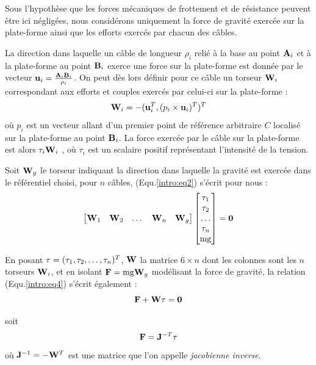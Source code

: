Sous l'hypothèse que les forces mécaniques de frottement et de résistance 
peuvent être ici négligées, nous considérons uniquement la force de gravité 
exercée sur la plate-forme ainsi que les efforts exercés par chacun des câbles.

La direction dans laquelle un câble de longueur $\rho_i$ relié à la base au 
point ${\bf A}_i$ et à la plate-forme au point ${\bf B}_i$ exerce une force sur 
la plate-forme est donnée par le vecteur ${\bf u}_i = \frac{{\bf A}_i{\bf 
B}_i}{\rho_i}$. On peut dès lors définir pour ce câble un torseur ${\bf W}_i$ 
correspondant aux efforts et couples exercés par celui-ci sur la plate-forme :
\begin{equation}
{\bf W}_i = -({\bf u}_i^T, (p_i \times {\bf u}_i)^T)^T
\label{intro:eq3}
\end{equation}
où $p_i$ est un vecteur allant d'un premier point de référence arbitraire 
$C$ localisé sur la plate-forme au point ${\bf B}_i$. La force exercée par le 
câble sur la plate-forme est alors $ \tau_i {\bf W}_i$ , où $\tau_i$ est un 
scalaire positif représentant l'intensité de la tension.

Soit ${\bf W}_g$ le torseur indiquant la direction dans laquelle la gravité est 
exercée dans le référentiel choisi, pour $n$ câbles, (Equ.\ref{intro:eq2}) 
s'écrit pour nous :
\begin{equation}
\begin{bmatrix}
 {\bf W}_1 & {\bf W}_2 & \dots & {\bf W}_n & {\bf W}_g
\end{bmatrix}
\begin{bmatrix}
 \tau_1 \\ \tau_2 \\ \dots \\ \tau_n \\ \hbox{mg}
\end{bmatrix}
= {\bf 0}
\label{intro:eq4}
\end{equation}

En posant ${\bf \tau} = (\tau_1, \tau_2, \dots, \tau_n)^T$, ${\bf W}$ la 
matrice 
$6 \times n$ dont les colonnes sont les $n$ torseurs ${\bf W}_i$, et en isolant 
$\mathcal {\bf F} =  \hbox{mg} {\bf W}_g$ modélisant la force de gravité, la 
relation (Equ.\ref{intro:eq4}) s'écrit également :
\begin{equation}
\mathcal {\bf F} + {\bf W} \tau = {\bf 0}
\label{intro:eq5a}
\end{equation}

soit  
\begin{equation}
\mathcal {\bf F} = {\bf J}^{-T} {\bf \tau}
\label{intro:eq5b}
\end{equation}
où ${\bf J}^{-1} = - {\bf W}^T$ est une matrice que l'on appelle {\it 
jacobienne 
inverse}.

